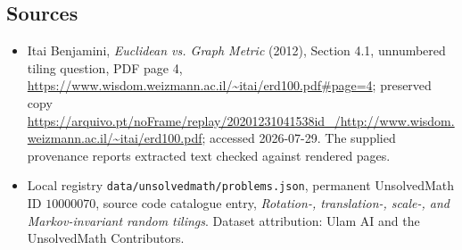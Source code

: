 \documentclass[11pt]{article}
\begin{document}
\subsection{Sources}
\begin{itemize}
\item Itai Benjamini, \emph{Euclidean vs. Graph Metric} (2012), Section 4.1, unnumbered tiling question, PDF page 4, \url{https://www.wisdom.weizmann.ac.il/~itai/erd100.pdf#page=4}; preserved copy \url{https://arquivo.pt/noFrame/replay/20201231041538id_/http://www.wisdom.weizmann.ac.il/~itai/erd100.pdf}; accessed 2026-07-29. The supplied provenance reports extracted text checked against rendered pages.
\item Local registry \texttt{data/unsolvedmath/problems.json}, permanent UnsolvedMath ID $10000070$, source code catalogue entry, \emph{Rotation-, translation-, scale-, and Markov-invariant random tilings}. Dataset attribution: Ulam AI and the UnsolvedMath Contributors.
\end{itemize}
\end{document}
